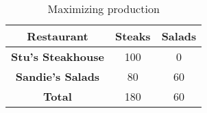 \begin{table}[h]
    \centering
      \begin{tabular}{|c|c|c|}
        \hline
        \textbf{Restaurant} & \textbf{Steaks} & \textbf{Salads} \\
        \hline
        \textbf{Stu's Steakhouse} & 100 & 0 \\
        \hline
        \textbf{Sandie's Salads} & 80 & 60 \\
        \hline
        \textbf{Total} & 180 & 60 \\
        \hline
      \end{tabular}
      \caption{Maximizing production}
    \end{table}